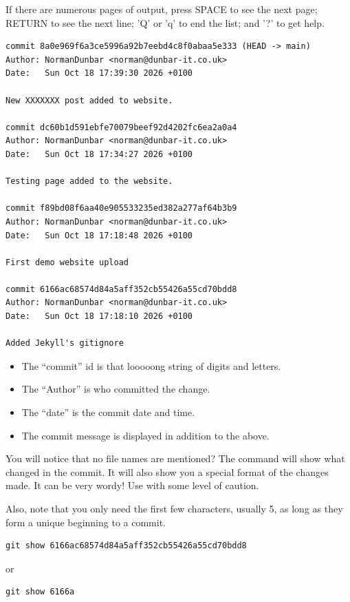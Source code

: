 If there are numerous pages of output, press SPACE to see the next page; RETURN to see the next line; 'Q' or 'q' to end the list; and '?' to get help.

\begin{lstlisting}[style=myText]
commit 8a0e969f6a3ce5996a92b7eebd4c8f0abaa5e333 (HEAD -> main)
Author: NormanDunbar <norman@dunbar-it.co.uk>
Date:   Sun Oct 18 17:39:30 2026 +0100

New XXXXXXX post added to website.

commit dc60b1d591ebfe70079beef92d4202fc6ea2a0a4
Author: NormanDunbar <norman@dunbar-it.co.uk>
Date:   Sun Oct 18 17:34:27 2026 +0100

Testing page added to the website.

commit f89bd08f6aa40e905533235ed382a277af64b3b9
Author: NormanDunbar <norman@dunbar-it.co.uk>
Date:   Sun Oct 18 17:18:48 2026 +0100

First demo website upload

commit 6166ac68574d84a5aff352cb55426a55cd70bdd8
Author: NormanDunbar <norman@dunbar-it.co.uk>
Date:   Sun Oct 18 17:18:10 2026 +0100

Added Jekyll's gitignore
\end{lstlisting}

\begin{itemize}
    \item The ``commit'' id is that looooong string of digits and letters.
    \item The ``Author'' is who committed the change.
    \item The ``date'' is the commit date and time.
    \item The commit message is displayed in addition to the above.
\end{itemize}

You will notice that no file names are mentioned? The command  will show what changed in the commit. It will also show you a special format of the changes made. It can be very wordy! Use with some level of caution.

Also, note that you only need the first few characters, usually 5, as long as they form a unique beginning to a commit.

\begin{lstlisting}[style=myText]
git show 6166ac68574d84a5aff352cb55426a55cd70bdd8
\end{lstlisting}

or

\begin{lstlisting}[style=myText]
git show 6166a
\end{lstlisting}

